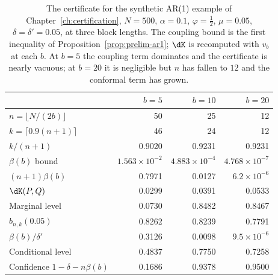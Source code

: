 
\begin{table}[htbp]
\centering\small
\caption{The certificate for the synthetic AR(1) example of Chapter~\ref{ch:certification}, $N=500$, $\alpha=0.1$, $\varphi=\tfrac12$, $\mu=0.05$, $\delta=\delta'=0.05$, at three block lengths. The coupling bound is the first inequality of Proposition~\ref{prop:prelim-ar1}; $\dK$ is recomputed with $v_b$ at each $b$. At $b=5$ the coupling term dominates and the certificate is nearly vacuous; at $b=20$ it is negligible but $n$ has fallen to $12$ and the conformal term has grown.}\label{tab:example-sweep}
\begin{tabular}{@{}lrrr@{}}
\toprule
 & $b=5$ & $b=10$ & $b=20$ \\
\midrule
$n=\lfloor N/(2b)\rfloor$ & 50 & 25 & 12 \\
$k=\lceil0.9(n+1)\rceil$ & 46 & 24 & 12 \\
$k/(n+1)$ & 0.9020 & 0.9231 & 0.9231 \\
$\beta(b)$ bound & $1.563\times10^{-2}$ & $4.883\times10^{-4}$ & $4.768\times10^{-7}$ \\
$(n+1)\beta(b)$ & 0.7971 & 0.0127 & $6.2\times10^{-6}$ \\
$\dK(P,Q)$ & 0.0299 & 0.0391 & 0.0533 \\
Marginal level & 0.0730 & 0.8482 & 0.8467 \\
$b_{n,k}(0.05)$ & 0.8262 & 0.8239 & 0.7791 \\
$\beta(b)/\delta'$ & 0.3126 & 0.0098 & $9.5\times10^{-6}$ \\
Conditional level & 0.4837 & 0.7750 & 0.7258 \\
Confidence $1-\delta-n\beta(b)$ & 0.1686 & 0.9378 & 0.9500 \\
\bottomrule
\end{tabular}
\end{table}

